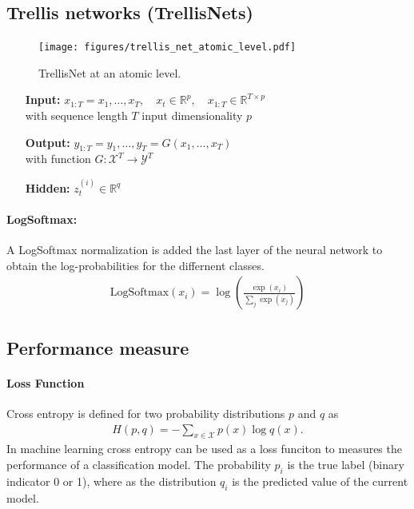 \documentclass{article}
\begin{document}
\subsection{Trellis networks (TrellisNets)}
\begin{figure}[htbp]
\centering
\texttt{[image: figures/trellis\_net\_atomic\_level.pdf]}
\caption{TrellisNet at an atomic level.}
\label{fig:TrellisNetAtomic}
\end{figure}	

\begin{itemize}
\item[\textbf{Input:}] $x_{1:T} = x_1, \dots, x_T, \quad x_t \in \mathbb R^p, \quad x_{1:T} \in \mathbb R^{T \times p}$ \vspace{0.5em}\\ 
with sequence length  $T$  input dimensionality  $p$
\item[\textbf{Output:}] $y_{1:T} = y_1, \dots, y_T = G(x_1, \dots, x_T)$ \vspace{0.5em} \\
with function $G: \mathcal X^T \rightarrow \mathcal Y^T$ 
\item[\textbf{Hidden:}] $z_t^{(i)} \in \mathbb R^q$
\end{itemize}




\paragraph{LogSoftmax:}

A LogSoftmax normalization is added the last layer of the neural network to obtain the log-probabilities for the differnent classes.
\begin{align}
\text{LogSoftmax}(x_i) = \log\left(\frac{\exp{(x_i)}}{\sum_j \exp(x_j)}\right)
\end{align} 



\subsection{Performance measure}

\paragraph{Loss Function}
Cross entropy is defined for two probability distributions $p$ and $q$ as
\begin{align}
H(p,q) = - \sum_{x \in \mathcal X} p(x) \log q(x).
\end{align} 
In machine learning cross entropy can be used as a loss funciton to measures the performance of a classification model. The probability $p_{i}$ is the true label (binary indicator 0 or 1), where as the distribution $q_{i}$ is the predicted value of the current model. 
\end{document}
